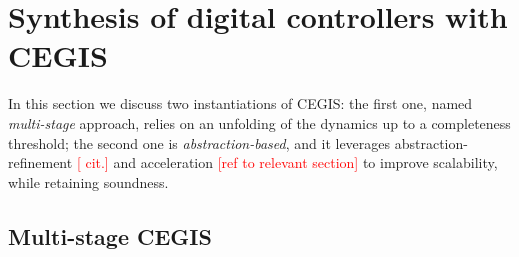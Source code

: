 \documentclass[twocolumn]{autart}    %
\renewcommand{\note}[1]{\textcolor{red}{[#1]}}
\begin{document}
\section{Synthesis of digital controllers with CEGIS} 
\label{sssec:cegisdig}

In this section we discuss two instantiations of CEGIS: 
the first one,
named {\it multi-stage} approach, 
relies on an unfolding of the dynamics up to a completeness threshold; 
the second one is {\it abstraction-based}, 
and it leverages abstraction-refinement \note{ cit.} and acceleration \note{ref to relevant section} to improve scalability,  
while retaining soundness. 

\subsection{Multi-stage CEGIS} 
\label{sssec:naive}
\end{document}
